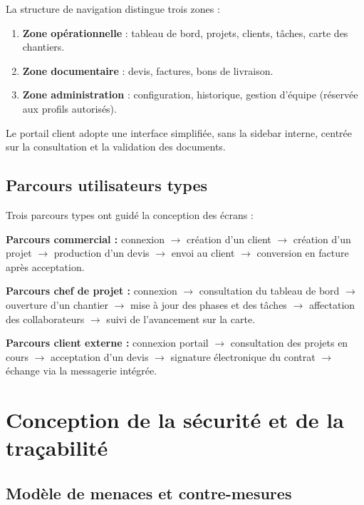 \medskip

La structure de navigation distingue trois zones :

\begin{enumerate}
  \item \textbf{Zone opérationnelle} : tableau de bord, projets, clients, tâches,
  carte des chantiers.
  \item \textbf{Zone documentaire} : devis, factures, bons de livraison.
  \item \textbf{Zone administration} : configuration, historique, gestion d'équipe
  (réservée aux profils autorisés).
\end{enumerate}

Le portail client adopte une interface simplifiée, sans la sidebar interne, centrée
sur la consultation et la validation des documents.

\subsection{Parcours utilisateurs types}

Trois parcours types ont guidé la conception des écrans :

\medskip

\textbf{Parcours commercial :} connexion $\rightarrow$ création d'un client
$\rightarrow$ création d'un projet $\rightarrow$ production d'un devis
$\rightarrow$ envoi au client $\rightarrow$ conversion en facture après acceptation.

\medskip

\textbf{Parcours chef de projet :} connexion $\rightarrow$ consultation du
tableau de bord $\rightarrow$ ouverture d'un chantier $\rightarrow$ mise à jour
des phases et des tâches $\rightarrow$ affectation des collaborateurs
$\rightarrow$ suivi de l'avancement sur la carte.

\medskip

\textbf{Parcours client externe :} connexion portail $\rightarrow$ consultation
des projets en cours $\rightarrow$ acceptation d'un devis $\rightarrow$ signature
électronique du contrat $\rightarrow$ échange via la messagerie intégrée.

\section{Conception de la sécurité et de la traçabilité}

\subsection{Modèle de menaces et contre-mesures}

